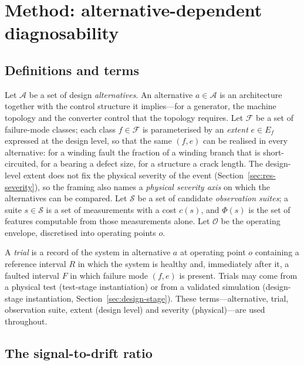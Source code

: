 \section{Method: alternative-dependent diagnosability}\label{sec:method}

\subsection{Definitions and terms}\label{sec:defs}

Let $\mathcal{A}$ be a set of design \emph{alternatives}. An alternative $a\in\mathcal{A}$ is an architecture together with the control structure it implies---for a generator, the machine topology and the converter control that the topology requires. Let $\mathcal{F}$ be a set of failure-mode classes; each class $f\in\mathcal{F}$ is parameterised by an \emph{extent} $e\in E_f$ expressed at the design level, so that the same $(f,e)$ can be realised in every alternative: for a winding fault the fraction of a winding branch that is short-circuited, for a bearing a defect size, for a structure a crack length. The design-level extent does not fix the physical severity of the event (Section~\ref{sec:res-severity}), so the framing also names a \emph{physical severity axis} on which the alternatives can be compared. Let $\mathcal{S}$ be a set of candidate \emph{observation suites}; a suite $s\in\mathcal{S}$ is a set of measurements with a cost $c(s)$, and $\Phi(s)$ is the set of features computable from those measurements alone. Let $\mathcal{O}$ be the operating envelope, discretised into operating points $o$.

A \emph{trial} is a record of the system in alternative $a$ at operating point $o$ containing a reference interval $R$ in which the system is healthy and, immediately after it, a faulted interval $F$ in which failure mode $(f,e)$ is present. Trials may come from a physical test (test-stage instantiation) or from a validated simulation (design-stage instantiation, Section~\ref{sec:design-stage}). These terms---alternative, trial, observation suite, extent (design level) and severity (physical)---are used throughout.

\subsection{The signal-to-drift ratio}\label{sec:sdr}


